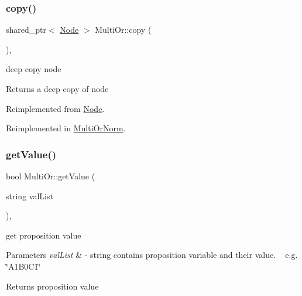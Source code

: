 \subsubsection{\texorpdfstring{copy()}{copy()}}
{\footnotesize\ttfamily shared\+\_\+ptr$<$ \hyperlink{class_node}{Node} $>$ Multi\+Or\+::copy (\begin{DoxyParamCaption}{ }\end{DoxyParamCaption})\hspace{0.3cm}{\ttfamily [override]}, {\ttfamily [virtual]}}



deep copy node 

\begin{DoxyReturn}{Returns}
a deep copy of node 
\end{DoxyReturn}


Reimplemented from \hyperlink{class_node_a0d22a418a622a24852610fd51910c5eb}{Node}.



Reimplemented in \hyperlink{class_multi_or_norm_a030bc7807678c834b467daa7a3a8dab5}{Multi\+Or\+Norm}.

\mbox{\label{class_multi_or_a7146240d304444ee0da5c949c584971e}} 
\subsubsection{\texorpdfstring{get\+Value()}{getValue()}}
{\footnotesize\ttfamily bool Multi\+Or\+::get\+Value (\begin{DoxyParamCaption}\item[{string}]{val\+List }\end{DoxyParamCaption})\hspace{0.3cm}{\ttfamily [override]}, {\ttfamily [virtual]}}



get proposition value 


\begin{DoxyParams}{Parameters}
{\em val\+List} & -\/ string contains proposition variable and their value. ~\newline
 e.\+g. \char`\"{}\+A1\+B0\+C1\char`\"{} \\
\hline
\end{DoxyParams}
\begin{DoxyReturn}{Returns}
proposition value 
\end{DoxyReturn}



